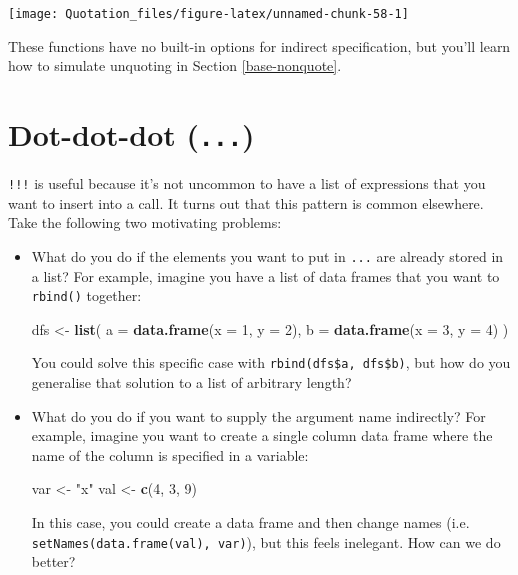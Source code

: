 \documentclass[]{book}
\makeatletter
\newenvironment{Shaded}{\begin{snugshade}}{\end{snugshade}}
\newcommand{\DataTypeTok}[1]{\textcolor[rgb]{0.27,0.27,0.27}{#1}}
\newcommand{\DecValTok}[1]{\textcolor[rgb]{0.06,0.06,0.06}{#1}}
\newcommand{\KeywordTok}[1]{\textcolor[rgb]{0.27,0.27,0.27}{\textbf{#1}}}
\newcommand{\NormalTok}[1]{#1}
\newcommand{\StringTok}[1]{\textcolor[rgb]{0.5,0.5,0.5}{#1}}
\newcommand{\indexc}[1]{\index{#1@\texttt{#1}}}
\makeatother
\begin{document}
\begin{center}\texttt{[image: Quotation\_files/figure-latex/unnamed-chunk-58-1]} \end{center}

These functions have no built-in options for indirect specification, but you'll learn how to simulate unquoting in Section \ref{base-nonquote}.

\hypertarget{tidy-dots}{%
\section{\texorpdfstring{Dot-dot-dot (\texttt{...})}{Dot-dot-dot (...)}}\label{tidy-dots}}

\indexc{...}


\texttt{!!!} is useful because it's not uncommon to have a list of expressions that you want to insert into a call. It turns out that this pattern is common elsewhere. Take the following two motivating problems:

\begin{itemize}
\item
  What do you do if the elements you want to put in \texttt{...} are already stored
  in a list? For example, imagine you have a list of data frames that
  you want to \texttt{rbind()} together:

\begin{Shaded}
\begin{Highlighting}[]
\NormalTok{dfs <-}\StringTok{ }\KeywordTok{list}\NormalTok{(}
  \DataTypeTok{a =} \KeywordTok{data.frame}\NormalTok{(}\DataTypeTok{x =} \DecValTok{1}\NormalTok{, }\DataTypeTok{y =} \DecValTok{2}\NormalTok{),}
  \DataTypeTok{b =} \KeywordTok{data.frame}\NormalTok{(}\DataTypeTok{x =} \DecValTok{3}\NormalTok{, }\DataTypeTok{y =} \DecValTok{4}\NormalTok{)}
\NormalTok{)}
\end{Highlighting}
\end{Shaded}

  You could solve this specific case with \texttt{rbind(dfs\$a,\ dfs\$b)}, but how
  do you generalise that solution to a list of arbitrary length?
\item
  What do you do if you want to supply the argument name indirectly? For
  example, imagine you want to create a single column data frame where
  the name of the column is specified in a variable:

\begin{Shaded}
\begin{Highlighting}[]
\NormalTok{var <-}\StringTok{ "x"}
\NormalTok{val <-}\StringTok{ }\KeywordTok{c}\NormalTok{(}\DecValTok{4}\NormalTok{, }\DecValTok{3}\NormalTok{, }\DecValTok{9}\NormalTok{)}
\end{Highlighting}
\end{Shaded}

  In this case, you could create a data frame and then change names
  (i.e. \texttt{setNames(data.frame(val),\ var)}), but this feels inelegant.
  How can we do better?
\end{itemize}
\end{document}
